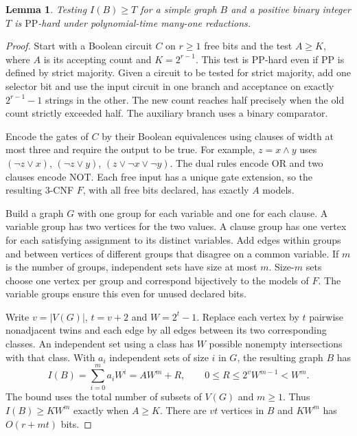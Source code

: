 \documentclass[11pt,a4paper]{amsart}
\newtheorem{lemma}[theorem]{Lemma}
\newcommand{\PP}{\mathrm{PP}}
\begin{document}
\begin{lemma}\label{source}
Testing \(I(B)\ge T\) for a simple graph \(B\) and a positive binary integer \(T\) is \(\PP\)-hard under polynomial-time many-one reductions.
\end{lemma}

\begin{proof}
Start with a Boolean circuit \(C\) on \(r\ge1\) free bits and the test \(A\ge K\), where \(A\) is its accepting count and \(K=2^{r-1}\). This test is \(\PP\)-hard even if \(\PP\) is defined by strict majority. Given a circuit to be tested for strict majority, add one selector bit and use the input circuit in one branch and acceptance on exactly \(2^{r-1}-1\) strings in the other. The new count reaches half precisely when the old count strictly exceeded half. The auxiliary branch uses a binary comparator.

Encode the gates of \(C\) by their Boolean equivalences using clauses of width at most three and require the output to be true. For example, \(z=x\wedge y\) uses \((\neg z\lor x)\), \((\neg z\lor y)\), \((z\lor\neg x\lor\neg y)\). The dual rules encode OR and two clauses encode NOT. Each free input has a unique gate extension, so the resulting 3-CNF \(F\), with all free bits declared, has exactly \(A\) models.

Build a graph \(G\) with one group for each variable and one for each clause. A variable group has two vertices for the two values. A clause group has one vertex for each satisfying assignment to its distinct variables. Add edges within groups and between vertices of different groups that disagree on a common variable. If \(m\) is the number of groups, independent sets have size at most \(m\). Size-\(m\) sets choose one vertex per group and correspond bijectively to the models of \(F\). The variable groups ensure this even for unused declared bits.

Write \(v=|V(G)|\), \(t=v+2\) and \(W=2^t-1\). Replace each vertex by \(t\) pairwise nonadjacent twins and each edge by all edges between its two corresponding classes. An independent set using a class has \(W\) possible nonempty intersections with that class. With \(a_i\) independent sets of size \(i\) in \(G\), the resulting graph \(B\) has
\[
 I(B)=\sum_{i=0}^m a_iW^i=AW^m+R,\qquad
 0\le R\le 2^v W^{m-1}<W^m .
\]
The bound uses the total number of subsets of \(V(G)\) and \(m\ge1\). Thus \(I(B)\ge KW^m\) exactly when \(A\ge K\). There are \(vt\) vertices in \(B\) and \(KW^m\) has \(O(r+mt)\) bits.
\end{proof}
\end{document}
